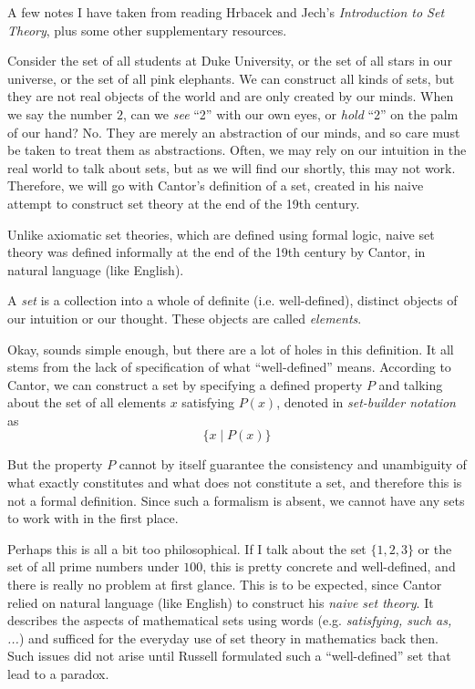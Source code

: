 A few notes I have taken from reading Hrbacek and Jech's \textit{Introduction to Set Theory}, plus some other supplementary resources. 

Consider the set of all students at Duke University, or the set of all stars in our universe, or the set of all pink elephants. We can construct all kinds of sets, but they are not real objects of the world and are only created by our minds. When we say the number $2$, can we \textit{see} ``2'' with our own eyes, or \textit{hold} ``2'' on the palm of our hand? No. They are merely an abstraction of our minds, and so care must be taken to treat them as abstractions. Often, we may rely on our intuition in the real world to talk about sets, but as we will find our shortly, this may not work. Therefore, we will go with Cantor's definition of a set, created in his naive attempt  to construct set theory at the end of the 19th century. 

Unlike axiomatic set theories, which are defined using formal logic, naive set theory was defined informally at the end of the 19th century by Cantor, 
in natural language (like English). 

\begin{definition}[Cantor]
  A \textit{set} is a collection into a whole of definite (i.e. well-defined), distinct objects of our intuition or our thought. These objects are called \textit{elements}. 
\end{definition}

Okay, sounds simple enough, but there are a lot of holes in this definition. It all stems from the lack of specification of what ``well-defined'' means. According to Cantor, we can construct a set by specifying a defined property $P$ and talking about the set of all elements $x$ satisfying $P(x)$, denoted in \textit{set-builder notation} as 
\begin{equation}
  \{x \mid P(x)\}
\end{equation}

But the property $P$ cannot by itself guarantee the consistency and unambiguity of what exactly constitutes and what does not constitute a set, and therefore this is not a formal definition. Since such a formalism is absent, we cannot have any sets to work with in the first place. 

Perhaps this is all a bit too philosophical. If I talk about the set $\{1, 2, 3\}$ or the set of all prime numbers under $100$, this is pretty concrete and well-defined, and there is really no problem at first glance. This is to be expected, since Cantor relied on natural language (like English) to construct his \textit{naive set theory}. It describes the aspects of mathematical sets using words (e.g. \textit{satisfying, such as, ...}) and sufficed for the everyday use of set theory in mathematics back then. Such issues did not arise until Russell formulated such a ``well-defined'' set that lead to a paradox. 

